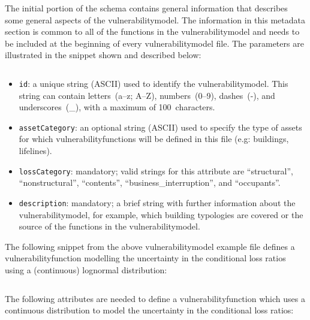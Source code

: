 The initial portion of the schema contains general information that describes
some general aspects of the \gls{vulnerabilitymodel}. The information in this
metadata section is common to all of the functions in the
\gls{vulnerabilitymodel} and needs to be included at the beginning of every
\gls{vulnerabilitymodel} file. The parameters are illustrated in the snippet
shown and described below:

\inputminted[firstline=4,firstnumber=4,lastline=8,fontsize=\footnotesize,frame=single,linenos,bgcolor=lightgray]{xml}{oqum/risk/verbatim/input_vulnerability.xml}

\begin{itemize}

  \item \Verb+id+: a unique string (ASCII) used to identify the
    \gls{vulnerabilitymodel}. This string can contain letters~(a--z; A--Z),
    numbers~(0--9), dashes~(-), and underscores~(\_), with a maximum of
    100~characters.

  \item \Verb+assetCategory+: an optional string (ASCII) used to specify the
    type of \glspl{asset} for which \glspl{vulnerabilityfunction} will be 
    defined in this file (e.g: buildings, lifelines).

  \item \Verb+lossCategory+: mandatory; valid strings for this attribute are 
    ``structural'', ``nonstructural'', ``contents'',  
    ``business\_interruption'', and ``occupants''.

  \item \Verb+description+: mandatory; a brief string with further information about the
    \gls{vulnerabilitymodel}, for example, which building typologies are 
    covered or the source of the functions in the \gls{vulnerabilitymodel}.

\end{itemize}


The following snippet from the above \gls{vulnerabilitymodel} example file defines
a \gls{vulnerabilityfunction} modelling the uncertainty in the conditional loss
ratios using a (continuous) lognormal distribution:

\inputminted[firstline=10,firstnumber=10,lastline=14,fontsize=\footnotesize,frame=single,linenos,bgcolor=lightgray]{xml}{oqum/risk/verbatim/input_vulnerability.xml}

The following attributes are needed to define a \gls{vulnerabilityfunction} which
uses a continuous distribution to model the uncertainty in the conditional
loss ratios:

